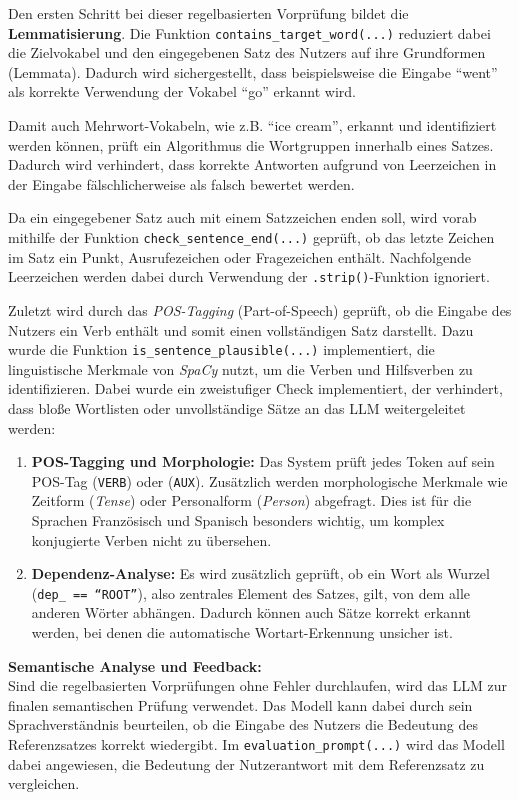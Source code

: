 Den ersten Schritt bei dieser regelbasierten Vorprüfung bildet die \textbf{Lemmatisierung}. Die Funktion \texttt{contains\_target\_word(...)} reduziert dabei die Zielvokabel 
und den eingegebenen Satz des Nutzers auf ihre Grundformen (Lemmata). Dadurch wird sichergestellt, dass beispielsweise die Eingabe \enquote{went} als korrekte Verwendung 
der Vokabel \enquote{go} erkannt wird.

Damit auch Mehrwort-Vokabeln, wie z.B. \enquote{ice cream}, erkannt und identifiziert werden können, prüft ein Algorithmus die Wortgruppen innerhalb eines Satzes.
Dadurch wird verhindert, dass korrekte Antworten aufgrund von Leerzeichen in der Eingabe fälschlicherweise als falsch bewertet werden.

Da ein eingegebener Satz auch mit einem Satzzeichen enden soll, wird vorab mithilfe der Funktion \texttt{check\_sentence\_end(...)} geprüft, ob das letzte Zeichen im Satz ein Punkt, Ausrufezeichen oder Fragezeichen enthält. Nachfolgende Leerzeichen werden dabei durch Verwendung der \texttt{.strip()}-Funktion ignoriert.

Zuletzt wird durch das \textit{POS-Tagging} (Part-of-Speech) geprüft, ob die Eingabe des Nutzers ein Verb enthält und somit einen vollständigen Satz darstellt. 
Dazu wurde die Funktion \texttt{is\_sentence\_plausible(...)} implementiert, die linguistische Merkmale von \textit{SpaCy} nutzt, um die Verben und Hilfsverben zu identifizieren. 
Dabei wurde ein zweistufiger Check implementiert, der verhindert, dass bloße Wortlisten oder unvollständige Sätze an das LLM weitergeleitet werden:
\begin{enumerate}
    \item \textbf{POS-Tagging und Morphologie:} Das System prüft jedes Token auf sein POS-Tag (\texttt{VERB}) oder (\texttt{AUX}). Zusätzlich werden morphologische Merkmale wie Zeitform (\textit{Tense}) oder Personalform (\textit{Person}) abgefragt. Dies ist für die Sprachen Französisch und Spanisch besonders wichtig, um komplex konjugierte Verben nicht zu übersehen.
    \item \textbf{Dependenz-Analyse:} Es wird zusätzlich geprüft, ob ein Wort als Wurzel (\texttt{dep\_ == \enquote{ROOT}}), also zentrales Element des Satzes, gilt, von dem alle anderen Wörter abhängen. Dadurch können auch Sätze korrekt erkannt werden, bei denen die automatische Wortart-Erkennung unsicher ist.
\end{enumerate} 
\bigskip
\textbf{Semantische Analyse und Feedback:}  \\
Sind die regelbasierten Vorprüfungen ohne Fehler durchlaufen, wird das LLM zur finalen semantischen Prüfung verwendet. 
Das Modell kann dabei durch sein Sprachverständnis beurteilen, ob die Eingabe des Nutzers die Bedeutung des Referenzsatzes korrekt wiedergibt.
Im \texttt{evaluation\_prompt(...)} wird das Modell dabei angewiesen, die Bedeutung der Nutzerantwort mit dem Referenzsatz zu vergleichen. 

